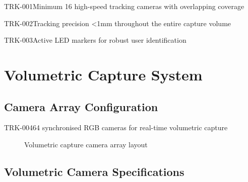 \begin{requirement}{TRK-001}{Minimum 16 high-speed tracking cameras with overlapping coverage}
\begin{requirement}{TRK-002}{Tracking precision <1mm throughout the entire capture volume}
\begin{requirement}{TRK-003}{Active LED markers for robust user identification}
\section{Volumetric Capture System}

\subsection{Camera Array Configuration}

\begin{requirement}{TRK-004}{64 synchronised RGB cameras for real-time volumetric capture}

\begin{figure}[H]
\centering
{}
\caption{Volumetric capture camera array layout}
\end{figure}

\subsection{Volumetric Camera Specifications}


\end{requirement}
\end{requirement}
\end{requirement}
\end{requirement}
